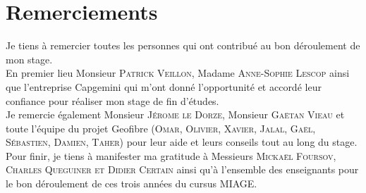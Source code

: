 \chapter*{Remerciements}
\begin{flushright}
Je tiens à remercier toutes les personnes qui ont contribué au bon déroulement de mon stage.
\\En premier lieu Monsieur \textsc{Patrick Veillon}, Madame \textsc{Anne-Sophie Lescop} ainsi que l'entreprise Capgemini
qui m'ont donné l'opportunité et accordé leur confiance pour réaliser mon stage de fin d'études.
\\Je remercie également Monsieur \textsc{Jérome le Dorze}, Monsieur \textsc{Gaëtan Vieau} et toute l'équipe du projet Geofibre (\textsc{Omar, Olivier, Xavier, Jalal, Gaël, Sébastien, Damien, Taher}) pour leur aide et leurs conseils tout au long du stage.
\\Pour finir, je tiens à manifester ma gratitude à Messieurs \textsc{Mickaël Foursov, Charles Queguiner et Didier Certain} ainsi qu'à l'ensemble des enseignants pour le bon déroulement de ces trois années du cursus MIAGE.
\end{flushright}
